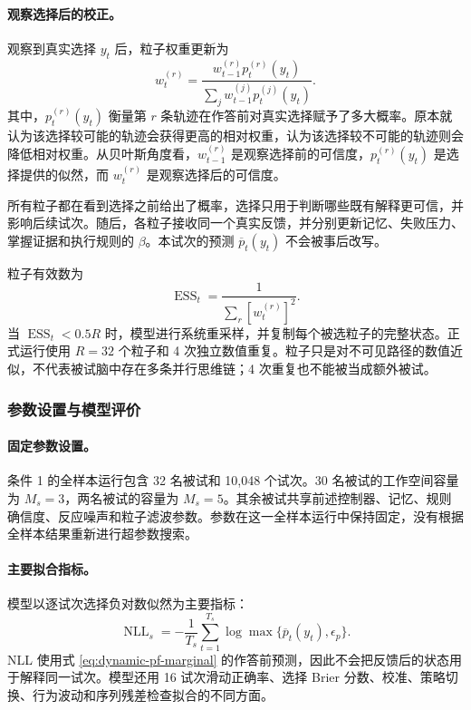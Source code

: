\paragraph{观察选择后的校正。}
观察到真实选择 $y_t$ 后，粒子权重更新为
\begin{equation}
w_t^{(r)}
=
\frac{w_{t-1}^{(r)}p_t^{(r)}(y_t)}
{\sum_jw_{t-1}^{(j)}p_t^{(j)}(y_t)}.
\label{eq:dynamic-pf-weight}
\end{equation}
其中，$p_t^{(r)}(y_t)$ 衡量第 $r$ 条轨迹在作答前对真实选择赋予了多大概率。原本就认为该选择较可能的轨迹会获得更高的相对权重，认为该选择较不可能的轨迹则会降低相对权重。从贝叶斯角度看，$w_{t-1}^{(r)}$ 是观察选择前的可信度，$p_t^{(r)}(y_t)$ 是选择提供的似然，而 $w_t^{(r)}$ 是观察选择后的可信度。

所有粒子都在看到选择之前给出了概率，选择只用于判断哪些既有解释更可信，并影响后续试次。随后，各粒子接收同一个真实反馈，并分别更新记忆、失败压力、掌握证据和执行规则的 $\beta$。本试次的预测 $\overline p_t(y_t)$ 不会被事后改写。

粒子有效数为
\begin{equation}
\operatorname{ESS}_t
=\frac{1}{\sum_r[w_t^{(r)}]^2}.
\label{eq:dynamic-ess}
\end{equation}
当 $\operatorname{ESS}_t<0.5R$ 时，模型进行系统重采样，并复制每个被选粒子的完整状态。正式运行使用 $R=32$ 个粒子和 4 次独立数值重复。粒子只是对不可见路径的数值近似，不代表被试脑中存在多条并行思维链；4 次重复也不能被当成额外被试。


\subsubsection{参数设置与模型评价}

\paragraph{固定参数设置。}
条件 1 的全样本运行包含 32 名被试和 10,048 个试次。30 名被试的工作空间容量为 $M_s=3$，两名被试的容量为 $M_s=5$。其余被试共享前述控制器、记忆、规则确信度、反应噪声和粒子滤波参数。参数在这一全样本运行中保持固定，没有根据全样本结果重新进行超参数搜索。

\paragraph{主要拟合指标。}
模型以逐试次选择负对数似然为主要指标：
\begin{equation}
\operatorname{NLL}_s
=-\frac{1}{T_s}\sum_{t=1}^{T_s}
\log\max\{\overline p_t(y_t),\epsilon_p\}.
\label{eq:dynamic-nll}
\end{equation}
NLL 使用式 \ref{eq:dynamic-pf-marginal} 的作答前预测，因此不会把反馈后的状态用于解释同一试次。模型还用 16 试次滑动正确率、选择 Brier 分数、校准、策略切换、行为波动和序列残差检查拟合的不同方面。


